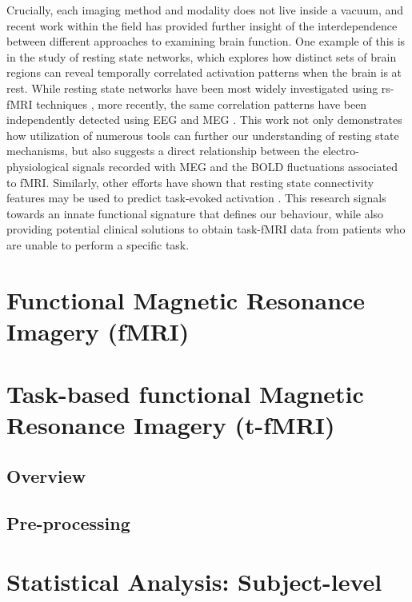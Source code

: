 Crucially, each imaging method and modality does not live inside a vacuum, and recent work within the field has provided further insight of the interdependence between different approaches to examining brain function. One example of this is in the study of resting state networks, which explores how distinct sets of brain regions can reveal temporally correlated activation patterns when the brain is at rest. While resting state networks have been most widely investigated using rs-fMRI techniques \citep[e.g.][]{Smith2009-dm, Lee2012-di, Moussa2012-bl}, more recently, the same correlation patterns have been independently detected using EEG and MEG \citep{Brookes2011-cj, Fomina2015-ha}. This work not only demonstrates how utilization of numerous tools can further our understanding of resting state mechanisms, but also suggests a direct relationship between the electro-physiological signals recorded with MEG and the BOLD fluctuations associated to fMRI. Similarly, other efforts have shown that resting state connectivity features may be used to predict task-evoked activation \citep{Parker_Jones2017-ld, Tavor2016-pd}. This research signals towards an innate functional signature that defines our behaviour, while also providing potential clinical solutions to obtain task-fMRI data from patients who are unable to perform a specific task.  

\section{Functional Magnetic Resonance Imagery (fMRI)}

\section{Task-based functional Magnetic Resonance Imagery (t-fMRI)}

\subsection{Overview}

\subsection{Pre-processing}

\section{Statistical Analysis: Subject-level}

